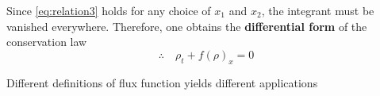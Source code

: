 \documentclass[12pt]{article}
\begin{document}
Since \eqref{eq:relation3} holds for any choice of $x_{1}$ and $x_{2}$, the integrant must be vanished
everywhere. Therefore, one obtains the \textbf{differential form} of the conservation law
\begin{equation}\label{eq:deri}
	\therefore \quad
	\boxed{\rho_{t} + f(\rho)_{x} = 0}
\end{equation}
\begin{example}
	Different definitions of flux function yields different applications
\end{example}
\end{document}
